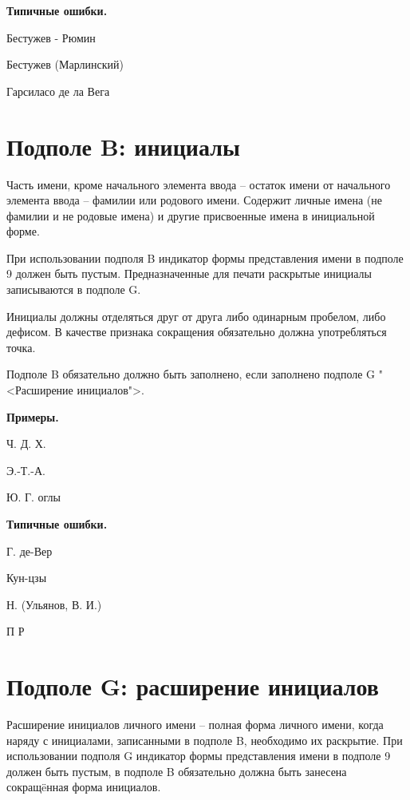 \textbf{Типичные ошибки.}

\begin{cutelist}
    \item Бестужев - Рюмин
    \item Бестужев (Марлинский)
    \item Гарсиласо де ла Вега
\end{cutelist}

\section{Подполе B: инициалы}

Часть имени, кроме начального элемента ввода -- остаток имени от начального элемента ввода -- фамилии или родового имени. Содержит личные имена (не фамилии и не родовые имена) и другие присвоенные имена в инициальной форме.


При использовании подполя B индикатор формы представления имени в подполе 9 должен быть пустым. Предназначенные для печати раскрытые инициалы записываются в подполе G.

Инициалы должны отделяться друг от друга либо одинарным пробелом, либо дефисом. В качестве признака сокращения обязательно должна употребляться точка.

Подполе B обязательно должно быть заполнено, если заполнено подполе G "<Расширение инициалов">.

\textbf{Примеры.}

\begin{cutelist}
    \item Ч. Д. Х.
    \item Э.-Т.-А.
    \item Ю. Г. оглы
\end{cutelist}

\textbf{Типичные ошибки.}

\begin{cutelist}
    \item Г. де-Вер
    \item Кун-цзы
    \item Н. (Ульянов, В. И.)
    \item П Р
\end{cutelist}

\section{Подполе G: расширение инициалов}

Расширение инициалов личного имени -- полная форма личного имени, когда наряду с инициалами, записанными в подполе B, необходимо их раскрытие.
При использовании подполя G индикатор формы представления имени в подполе 9 должен быть пустым, в подполе B обязательно должна быть занесена сокращ\"eнная форма инициалов.

